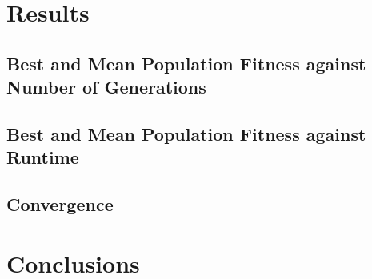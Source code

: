 \documentclass[10pt, a4paper]{article}
\begin{document}
\section{Results}
\label{sec:results}

\subsection{Best and Mean Population Fitness against Number of Generations}

\subsection{Best and Mean Population Fitness against Runtime}

\subsection{Convergence}

\section{Conclusions}




\end{document}
